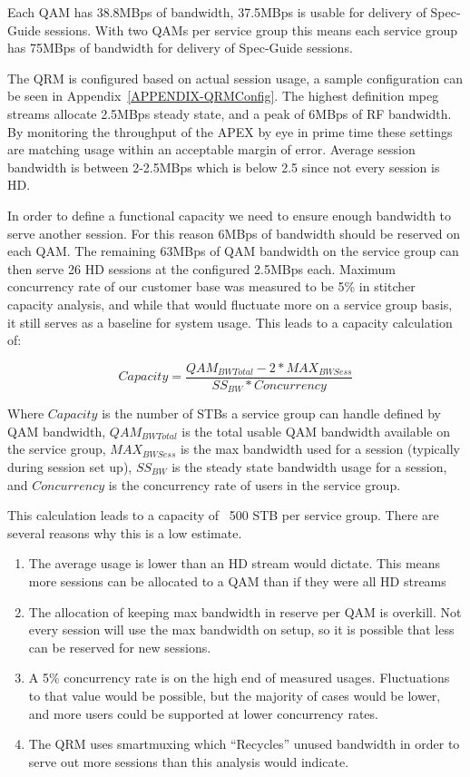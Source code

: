 \documentclass{article}
\begin{document}
Each QAM has 38.8MBps of bandwidth, 37.5MBps is usable for delivery of Spec-Guide sessions. With two QAMs per service group this means each service group has 75MBps of bandwidth for delivery of Spec-Guide sessions. 

The QRM is configured based on actual session usage, a sample configuration can be seen in Appendix~\ref{APPENDIX-QRMConfig}. The highest definition mpeg streams allocate 2.5MBps steady state, and a peak of 6MBps of RF bandwidth. By monitoring the throughput of the APEX by eye in prime time these settings are matching usage within an acceptable margin of error. Average session bandwidth is between 2-2.5MBps which is below 2.5 since not every session is HD. 

In order to define a functional capacity we need to ensure enough bandwidth to serve another session. For this reason 6MBps of bandwidth should be reserved on each QAM. The remaining 63MBps of QAM bandwidth on the service group can then serve 26 HD sessions at the configured 2.5MBps each. Maximum concurrency rate of our customer base was measured to be 5\% in stitcher capacity analysis, and while that would fluctuate more on a service group basis, it still serves as a baseline for system usage. This leads to a capacity calculation of: 

$$Capacity=\frac{QAM_{BWTotal}-2*MAX_{BWSess}}{SS_{BW}*Concurrency}$$ 

Where $Capacity$ is the number of STBs a service group can handle defined by QAM bandwidth, $QAM_{BWTotal}$ is the total usable QAM bandwidth available on the service group, $MAX_{BWSess}$ is the max bandwidth used for a session (typically during session set up), $SS_{BW}$ is the steady state bandwidth usage for a session, and $Concurrency$ is the concurrency rate of users in the service group. 

This calculation leads to a capacity of ~500 STB per service group. There are several reasons why this is a low estimate. 

\begin{enumerate}
\item The average usage is lower than an HD stream would dictate. This means more sessions can be allocated to a QAM than if they were all HD streams
\item The allocation of keeping max bandwidth in reserve per QAM is overkill. Not every session will use the max bandwidth on setup, so it is possible that less can be reserved for new sessions. 
\item A 5\% concurrency rate is on the high end of measured usages. Fluctuations to that value would be possible, but the majority of cases would be lower, and more users could be supported at lower concurrency rates. 
\item The QRM uses smartmuxing which ``Recycles'' unused bandwidth in order to serve out more sessions than this analysis would indicate. 
\end{enumerate}
\end{document}

